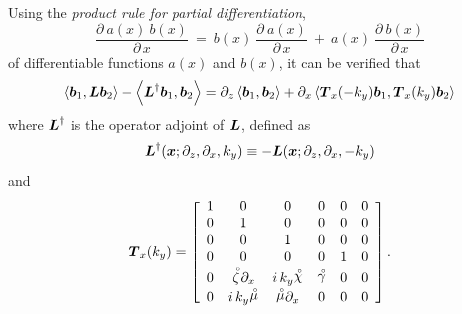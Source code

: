 Using the {\em product rule for partial differentiation\/},
\[
{\frac{ \partial   \ a(x)\ b(x)}{ \partial   \, 
x}}\ =\ b(x)\ {\frac{ \partial   \ a(x)}{ \partial   
\, x}}\ +\ a(x)\ {\frac{ \partial   \ b(x)}{ \partial  
 \, x}} 
\] 
of differentiable functions $a(x)$ and $b(x)$, it can be verified that 
\begin{equation} \label{partialint3}
\left\langle{{\bmi b}_{1},{\bmi L}{\bmi b}_{2}}\right\rangle-\left\langle{ 
{\bmi L}^{\dagger} {\bmi b}_{1},
{\bmi b}_{2}}\right\rangle
={ \partial }_{z}\left\langle{\bmi b}_{1},{\bmi b}_{2}\right\rangle
+{ \partial }_{x}\left\langle{\bmi T}_x(-k_y){\bmi b}{}_{1},
{\bmi T}_x(k_y){\bmi b}{}_{2}\right\rangle
\end{equation} 
where ${\bmi L}^{\dagger}$ is the operator adjoint of ${\bmi L}$, defined as
\begin{equation} \label{Ladjdef}
{\bmi L}^{\dagger}({\bmi x};{\partial }_{z},{\partial }_{x},{k}_{y})\equiv 
-{\bmi L}({\bmi x};{\partial }_{z},{\partial }_{x},-{k}_{y})
\end{equation}
and
\begin{equation} \label{Tractdef}
{\bmi T}_x(k_y)=\left[{\begin{array}{cccccc}
1&0&0&0&0&0\\
0&1&0&0&0&0\\
0&0&1&0&0&0\\
0&0&0&0&1&0\\
0&{\rf \zeta} {\partial }_{ x}& i\,{k}_{y} {\rf \chi} &{\rf \gamma} & 0&0\\
0&i\,{k}_{y}{\rf \mu} &{\rf \mu} {\partial }_{ x}& 0&0&0\end{array}}\right].
\end{equation}



